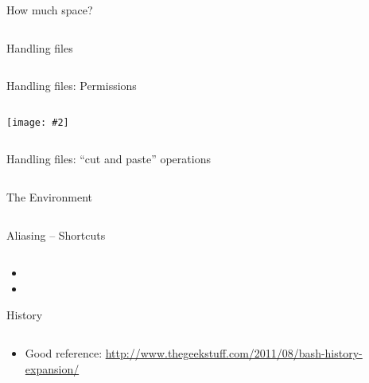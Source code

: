 \documentclass[hyperref={pdfpagelabels=false},12pt]{beamer}
\newcommand{\ig}[2]{\texttt{[image: \#2]}}
\newcommand{\myvbutton}[2]{\vfill\hyperlink{#1}{\beamerbutton{{#2}}}}
\begin{document}
\begin{frame}{How much space?}
\inputminted[bgcolor=lightgray,linenos,fontsize=\footnotesize]{bash}{code/navigate-the-filesystem-3.txt}
\end{frame}

\begin{frame}{Handling files}
\inputminted[bgcolor=lightgray,linenos,fontsize=\footnotesize]{bash}{code/handling-files-1.txt}
\end{frame}

\begin{frame}{Handling files: Permissions}
\inputminted[bgcolor=lightgray,linenos,fontsize=\footnotesize]{bash}{code/handling-files-2.txt}
\begin{center}
    \ig{0.75}{images/permissions.png}
\end{center}
\inputminted[bgcolor=lightgray,linenos,fontsize=\footnotesize]{bash}{code/handling-files-3.txt}
\end{frame}

\begin{frame}{Handling files: ``cut and paste'' operations}
\inputminted[bgcolor=lightgray,linenos,fontsize=\footnotesize]{bash}{code/handling-files-4.txt}
\end{frame}

\begin{frame}[label=environment]{The Environment}
\inputminted[bgcolor=lightgray,linenos,fontsize=\footnotesize]{bash}{code/the-environment-1.txt}
\myvbutton{exercises-1}{exercises}
\end{frame}

\begin{frame}{Aliasing -- Shortcuts}
\inputminted[bgcolor=lightgray,linenos,fontsize=\footnotesize]{bash}{code/the-environment-2.txt}
\begin{itemize}
    \item \color{red}{Don't use these for ssh!}
    \item \color{red}{Don't use these in scripts!}
\end{itemize}
\end{frame}

\begin{frame}{History}
\inputminted[bgcolor=lightgray,linenos,fontsize=\footnotesize]{bash}{code/the-environment-3.txt}
\begin{itemize}
    \item Good reference: \url{http://www.thegeekstuff.com/2011/08/bash-history-expansion/}
\end{itemize}
\end{frame}
\end{document}
